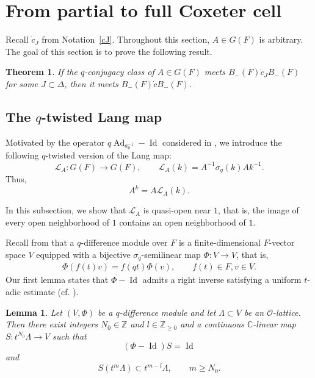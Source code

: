 \documentclass[11pt]{amsart}
\numberwithin{equation}{section}
\newtheorem{theorem}{Theorem}[section]
\newtheorem{lemma}[lemma]{Lemma}
\theoremstyle{definition}
\theoremstyle{remark}
\DeclareMathOperator{\Ad}{Ad}
\DeclareMathOperator{\Id}{Id}
\begin{document}
\section{From partial to full Coxeter cell}\label{sec:promotion}
Recall $\dot c_J$ from Notation~\ref{cJ}.
Throughout this section, $A\in G(F)$ is arbitrary. The goal of this section is to prove the following result.
\begin{theorem}\label{thm:promotion-intro}
If the $q$-conjugacy class of $A\in G(F)$ meets
$B_-(F)\dot c_JB_-(F)$ for some $J\subset\Delta$, then it
meets $B_-(F)\dot cB_-(F)$.
\end{theorem}
\subsection{The $q$-twisted Lang map}\label{sec:lang}
Motivated by the operator
$q\Ad_{a_0^{-1}}-\Id$ considered in \cite[Section~2]{BG}, we introduce
the following $q$-twisted version of the Lang map:
\begin{equation}\label{eq:lang-map}
  \mathcal{L}_A:G(F)\longrightarrow G(F),\qquad
  \mathcal{L}_A(k)=A^{-1}\sigma_q(k)Ak^{-1}.
\end{equation}
Thus,
\begin{equation}\label{eq:gauge-lang}
  A^k=A\mathcal{L}_A(k).
\end{equation}

In this subsection, we show that $\mathcal L_A$ is quasi-open near $1$, that is, the image of every open neighborhood of $1$ contains an open neighborhood of $1$.

Recall from \cite{Liu} that a $q$-difference module over $F$ is a finite-dimensional $F$-vector
space $V$ equipped with a bijective $\sigma_q$-semilinear map $\Phi:V\rightarrow V$, that is, 
\begin{align}
    \Phi(f(t)v)=f(qt)\Phi(v), \qquad f(t)\in F, v\in V.
\end{align}
Our first lemma states that $\Phi-\operatorname{Id}$ admits a right inverse satisfying a uniform $t$-adic estimate (cf. \cite[Lemma~5.1.1]{GHKR1}).
\begin{lemma}\label{lem:right-inverse-lattice}
Let $(V,\Phi)$ be a $q$-difference module and let $\Lambda\subset V$ be an
$\mathcal{O}$-lattice.  Then there exist integers $N_0\in\mathbb{Z}$ and $l\in\mathbb{Z}_{\geq0}$ and a continuous
$\mathbb{C}$-linear map
$S:t^{N_0}\Lambda\longrightarrow V$ such that
\begin{equation}\label{eq:right-inverse}
  (\Phi-\operatorname{Id})S=\operatorname{Id}
\end{equation}
and
\begin{equation}
  S(t^m\Lambda)\subset t^{m-l}\Lambda,
  \qquad m\geq N_0.
\end{equation}

\end{lemma}
\end{document}
